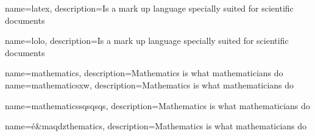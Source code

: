 {
    name=latex,
    description={Is a mark up language specially suited 
    for scientific documents}
}

{
    name=lolo,
    description={Is a mark up language specially suited 
    for scientific documents}
}

{
    name=mathematics,
    description={Mathematics is what mathematicians do}
}
{
    name=mathematicsxw,
    description={Mathematics is what mathematicians do}
}

{
    name=mathematicssqsqsqs,
    description={Mathematics is what mathematicians do}
}

{
    name=é&maqdzthematics,
    description={Mathematics is what mathematicians do}
}